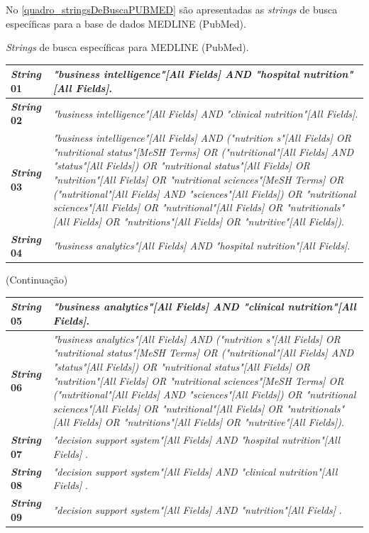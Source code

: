 No \autoref{quadro_stringsDeBuscaPUBMED} são apresentadas as \textit{strings} de busca específicas para a base de dados MEDLINE (PubMed).   

\begin{quadro}[htb]
\caption{\label{quadro_stringsDeBuscaPUBMED}\textit{Strings} de busca específicas para MEDLINE (PubMed).}
\label{}
\begin{tabular}{|p{2cm}|p{11cm}|}
	\hline
	\textbf{\textit{String} 01}	& \textit{"business intelligence"[All Fields] AND "hospital nutrition"[All Fields]}.\\ \hline
	\textbf{\textit{String} 02}	& \textit{"business intelligence"[All Fields] AND "clinical nutrition"[All Fields]}.\\ \hline
	\textbf{\textit{String} 03}	& \textit{"business intelligence"[All Fields] AND ("nutrition s"[All Fields] OR "nutritional status"[MeSH Terms] OR ("nutritional"[All Fields] AND "status"[All Fields]) OR "nutritional status"[All Fields] OR "nutrition"[All Fields] OR "nutritional sciences"[MeSH Terms] OR ("nutritional"[All Fields] AND "sciences"[All Fields]) OR "nutritional sciences"[All Fields] OR "nutritional"[All Fields] OR "nutritionals"[All Fields] OR "nutritions"[All Fields] OR "nutritive"[All Fields])}.   \\ \hline
	\textbf{\textit{String} 04}	& \textit{"business analytics"[All Fields] AND "hospital nutrition"[All Fields]}.	\\ \hline

\end{tabular}
\end{quadro}

\begin{quadro}[htb]
\label{}(Continuação)
\begin{tabular}{|p{2cm}|p{11cm}|}
    \hline
	\textbf{\textit{String} 05}	& \textit{"business analytics"[All Fields] AND "clinical nutrition"[All Fields]}. \\ \hline
	\textbf{\textit{String} 06}	& \textit{"business analytics"[All Fields] AND ("nutrition s"[All Fields] OR "nutritional status"[MeSH Terms] OR ("nutritional"[All Fields] AND "status"[All Fields]) OR "nutritional status"[All Fields] OR "nutrition"[All Fields] OR "nutritional sciences"[MeSH Terms] OR ("nutritional"[All Fields] AND "sciences"[All Fields]) OR "nutritional sciences"[All Fields] OR "nutritional"[All Fields] OR "nutritionals"[All Fields] OR "nutritions"[All Fields] OR "nutritive"[All Fields])}. \\ \hline
	\textbf{\textit{String} 07}	& \textit{"decision support system"[All Fields] AND "hospital nutrition"[All Fields]
}.\\ \hline
    \textbf{\textit{String} 08}	& \textit{"decision support system"[All Fields] AND "clinical nutrition"[All Fields]
}.\\ \hline
    \textbf{\textit{String} 09}	& \textit{"decision support system"[All Fields] AND "nutrition"[All Fields]
}.\\ \hline
\end{tabular}
\end{quadro}

